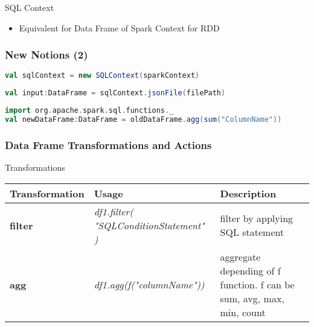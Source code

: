 \documentclass[slidetop,9pt,utf8]{beamer}
\begin{document}
\begin{CJK}{UTF8}{gbsn}
\begin{frame}
  \begin{block}{SQL Context}
    \begin{itemize}
      \item Equivalent for Data Frame of Spark Context for RDD
    \end{itemize}
  \end{block}

\end{frame}

\begin{frame}[fragile]
  \frametitle{New Notions (2)}

  \begin{lstlisting}[label=SqlContextInitialization, caption=Init Spark SQL Context, language=scala, style=code]
val sqlContext = new SQLContext(sparkContext)
  \end{lstlisting}

  \begin{lstlisting}[label=JsonFileLoading, caption=Load a Data Frame from JSON file, language=scala, style=code]
val input:DataFrame = sqlContext.jsonFile(filePath)
  \end{lstlisting}

  \begin{lstlisting}[label=AggregationByFunction, caption=Aggregation by a SQL Function, language=scala, style=code]
import org.apache.spark.sql.functions._
val newDataFrame:DataFrame = oldDataFrame.agg(sum("ColumnName"))
  \end{lstlisting}

\end{frame}

\begin{frame}

  \frametitle{Data Frame Transformations and Actions}

  \begin{block}{Transformations}
    \begin{center}
      \begin{tabular}{|m{2.1cm}|m{3.5cm}|m{5cm}|}
        \hline 
        \rowcolor{gray} \textbf{Transformation} & \textbf{Usage} & \textbf{Description} \\ \hline
        \textbf{filter} & \textit{df1.filter( \newline  "SQLConditionStatement" \newline )} & filter by applying SQL statement \\ \hline
        \textbf{agg} & \textit{df1.agg(f("columnName"))} & aggregate depending of f function. f can be sum, avg, max, min, count\\ \hline
      \end{tabular}
    \end{center}
  \end{block}


\end{frame}
\end{CJK}
\end{document}
